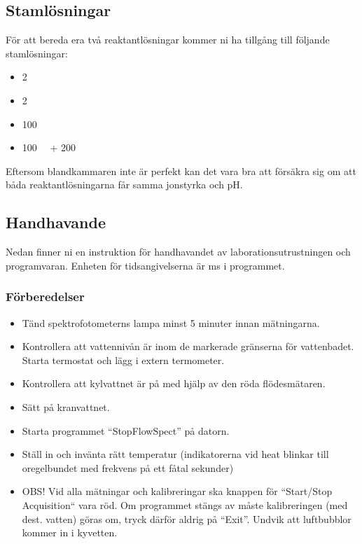 \subsection{Stamlösningar}
För att bereda era två reaktantlösningar kommer ni ha tillgång till följande
stamlösningar:

\begin{itemize}
\item \SI{2}{\Molar} 
\item \SI{2}{\Molar} 
\item \SI{100}{\milli\Molar} 
\item \SI{100}{\milli\Molar}  + \SI{200}{\milli\Molar} 
\end{itemize}

Eftersom blandkammaren inte är perfekt kan det vara bra att försäkra sig
om att båda reaktantlösningarna får samma jonstyrka och pH.

\subsection{Handhavande}
\label{sec:handhavande}
Nedan finner ni en instruktion för handhavandet av
laborationsutrustningen och programvaran. Enheten för tidsangivelserna är
\si{\milli\second} i programmet.

\subsubsection{Förberedelser}
\begin{itemize}
\item Tänd spektrofotometerns lampa minst 5 minuter innan mätningarna.
\item Kontrollera att vattennivån är inom de markerade gränserna för vattenbadet.
Starta termostat och lägg i extern termometer.
\item Kontrollera att kylvattnet är på med hjälp av den röda flödesmätaren.
\item Sätt på kranvattnet.
\item Starta programmet ``StopFlowSpect'' på datorn.
\item Ställ in och invänta rätt temperatur (indikatorerna vid heat
  blinkar till oregelbundet med frekvens på ett fåtal sekunder)
\item OBS! Vid alla mätningar och
  kalibreringar ska knappen för ``Start/Stop Acquisition`` vara röd. Om
  programmet stängs av måste kalibreringen (med dest. vatten) göras om,
  tryck därför aldrig på ``Exit''. Undvik att luftbubblor kommer in i
  kyvetten.
\end{itemize}
